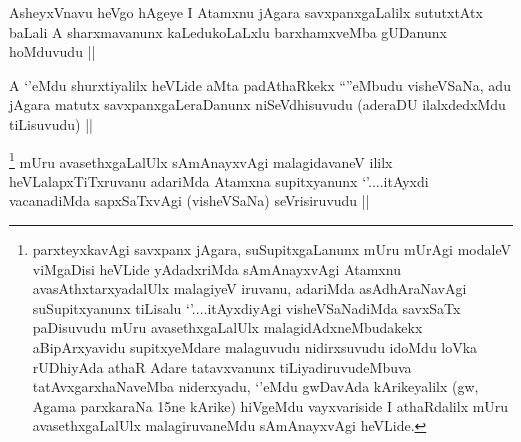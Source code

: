 \begin{artha}
AsheyxVnavu heVgo hAgeye I Atamxnu jAgara savxpanxgaLalilx sututxtAtx baLali A sharxmavanunx kaLedukoLaLxlu barxhamxveMba gUDanunx hoMduvudu ||
\end{artha}


\begin{artha}
A `\stext'eMdu shurxtiyalilx heVLide aMta padAthaRkekx ``\stext''eMbudu visheVSaNa, adu jAgara matutx savxpanxgaLeraDanunx niSeVdhisuvudu (aderaDU ilalxdedxMdu tiLisuvudu) ||
\end{artha}


\begin{artha}
\footnote{parxteyxkavAgi savxpanx jAgara, suSupitxgaLanunx mUru mUrAgi modaleV viMgaDisi heVLide yAdadxriMda sAmAnayxvAgi Atamxnu avasAthxtarxyadalUlx malagiyeV iruvanu, adariMda asAdhAraNavAgi suSupitxyanunx tiLisalu `\stext'....itAyxdiyAgi visheVSaNadiMda savxSaTx paDisuvudu mUru avasethxgaLalUlx malagidAdxneMbudakekx aBipArxyavidu supitxyeMdare malaguvudu nidirxsuvudu idoMdu loVka rUDhiyAda athaR Adare tatavxvanunx tiLiyadiruvudeMbuva tatAvxgarxhaNaveMba niderxyadu, `\stext'eMdu gwDavAda kArikeyalilx (gw, Agama parxkaraNa 15ne kArike) hiVgeMdu vayxvariside I athaRdalilx mUru avasethxgaLalUlx malagiruvaneMdu sAmAnayxvAgi heVLide.}
mUru avasethxgaLalUlx sAmAnayxvAgi malagidavaneV ililx heVLalapxTiTxruvanu adariMda Atamxna supitxyanunx `\stext'....itAyxdi vacanadiMda sapxSaTxvAgi (visheVSaNa) seVrisiruvudu ||
\end{artha}


